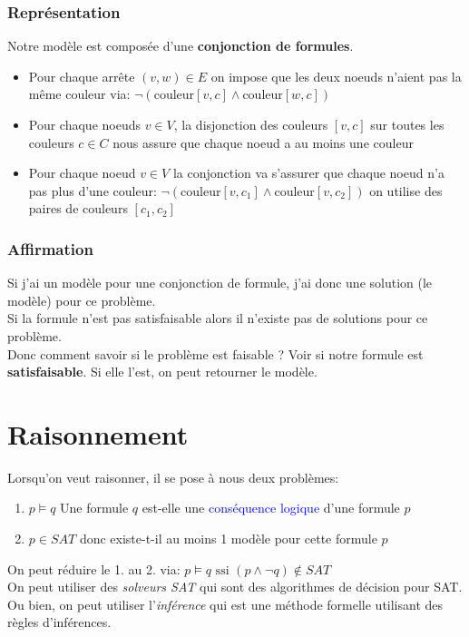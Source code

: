 \documentclass{report}
\begin{document}
\subsubsection{Représentation}
Notre modèle est composée d'une \textbf{conjonction de formules}.
\begin{itemize}
\item Pour chaque arrête $(v,w) \in E$ on impose que les deux noeuds n'aient pas la même couleur via: $\neg(\text{couleur}[v,c]\wedge \text{couleur}[w,c])$
\item Pour chaque noeuds $v \in V$, la disjonction des couleurs $ [v,c] $ sur toutes les couleurs $c \in C$ nous assure que chaque noeud a au moins une couleur
\item Pour chaque noeud $v \in V$ la conjonction va s'assurer que chaque noeud n'a pas plus d'une couleur: $\neg ( \text{couleur}[v, c_1] \wedge \text{couleur}[v, c_2])$ on utilise des paires de couleurs $ [c_1, c_2] $
\end{itemize}

\subsubsection{Affirmation}
Si j'ai un modèle pour une conjonction de formule, j'ai donc une solution (le modèle) pour ce problème.\\
Si la formule n'est pas satisfaisable alors il n'existe pas de solutions pour ce problème.\\
Donc comment savoir si le problème est faisable ? Voir si notre formule est \textbf{satisfaisable}. Si elle l'est, on peut retourner le modèle.


\section{Raisonnement}
Lorsqu'on veut raisonner, il se pose à nous deux problèmes:
\begin{enumerate}
\item $p \models q$ Une formule $q$ est-elle une \textcolor{blue}{conséquence logique} d'une formule $p$
\item $p \in SAT$ donc existe-t-il au moins 1 modèle pour cette formule $p$
\end{enumerate}
On peut réduire le 1. au 2. via: $p \models q \text{ ssi } (p \wedge \neg q) \notin SAT$\\

On peut utiliser des \textit{solveurs SAT} qui sont des algorithmes de décision pour SAT.\\
Ou bien, on peut utiliser l'\textit{inférence} qui est une méthode formelle utilisant des règles d'inférences.
\end{document}
